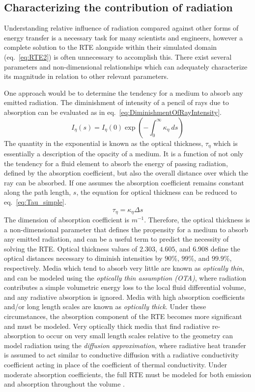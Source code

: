 \subsection{Characterizing the contribution of radiation}
Understanding relative influence of radiation compared against other forms of energy transfer is a necessary task for many scientists and engineers, however a complete solution to the RTE alongside within their simulated domain (eq.~\ref{eq:RTE2}) is often unnecessary to accomplish this. 
There exist several parameters and non-dimensional relationships which can adequately characterize its magnitude in relation to other relevant parameters.

One approach would be to determine the tendency for a medium to absorb any emitted radiation. The diminishment of intensity of a pencil of rays due to absorption can be evaluated as in eq.~\ref{eq:DiminishmentOfRayIntensity}.
\begin{equation}
    I_\eta{}(s)=I_\eta{}(0)\exp{\left(-\int^\infty_0{\kappa{}_\eta{}~ds}\right)}
    \label{eq:DiminishmentOfRayIntensity}
\end{equation}
The quantity in the exponential is known as the optical thickness, $\tau{}_\eta{}$ which is essentially a description of the opacity of a medium. It is a function of not only the tendency for a fluid element to absorb the energy of passing radiation, defined by the absorption coefficient, but also the overall distance over which the ray can be absorbed.
If one assumes the absorption coefficient remains constant along the path length, $s$, the equation for optical thickness can be reduced to eq.~\ref{eq:Tau_simple}.
\begin{equation}
    \tau{}_\eta = \kappa{}_\eta{}\Delta{s}
    \label{eq:Tau_simple}
\end{equation}
The dimension of absorption coefficient is $m^{-1}$. Therefore, the optical thickness is a non-dimensional parameter that defines the propensity for a medium to absorb any emitted radiation, and can be a useful term to predict the necessity of solving the RTE. 
Optical thickness values of $2.303$, $4.605$, and $6.908$ define the optical distances necessary to diminish intensities by $90$\%, $99$\%, and $99.9$\%, respectively.
Media which tend to absorb very little are known as \textit{optically thin}, and can be modeled using the \textit{optically thin assumption (OTA)}, where radiation contributes a simple volumetric energy loss to the local fluid differential volume, and any radiative absorption is ignored.
Media with high absorption coefficients and/or long length scales are known as \textit{optically thick}. Under these circumstances, the absorption component of the RTE becomes more significant and must be modeled.
Very optically thick media that find radiative re-absorption to occur on very small length scales relative to the geometry can model radiation using the \textit{diffusion approximation}, where radiative heat transfer is assumed to act similar to conductive diffusion with a radiative conductivity coefficient acting in place of the coefficient of thermal conductivity. 
Under moderate absorption coefficients, the full RTE must be modeled for both emission and absorption throughout the volume \cite{Modest2013RadiativeTransfer}.

